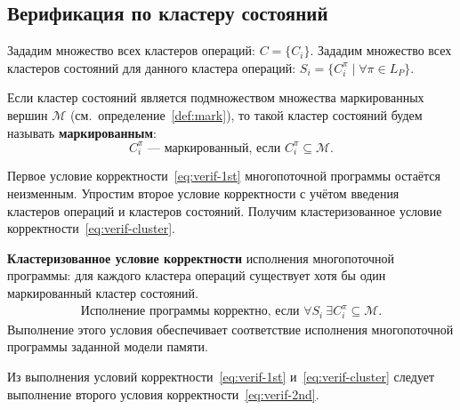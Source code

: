 \subsection{Верификация по кластеру состояний}
\label{sec:ch4/stategraph-cluster-verification}

Зададим множество всех кластеров операций: $C = \{C_i\}$. Зададим
множество всех кластеров состояний для данного кластера операций:
$S_i = \{C_i^{\pi} \mid \forall \pi \in L_P\}$.

\begin{definition}
  \label{eq:executed_st_cl}
  Если кластер состояний является подмножеством множества
  маркированных вершин $\mathcal{M}$
  (см.~определение~\ref{def:mark}), то такой кластер состояний будем
  называть \textbf{маркированным}:
  \begin{equation}
    C_i^\pi \text{ — маркированный, если } C_i^\pi \subseteq \mathcal{M}.
  \end{equation}
\end{definition}

Первое условие корректности~\ref{eq:verif-1st} многопоточной
программы остаётся неизменным. Упростим второе условие корректности с
учётом введения кластеров операций и кластеров состояний. Получим
кластеризованное условие корректности~\ref{eq:verif-cluster}.

\textbf{Кластеризованное условие корректности} исполнения
многопоточной программы: для каждого кластера операций существует
хотя бы один маркированный кластер состояний.
\begin{align}
  \label{eq:verif-cluster}
  \text{Исполнение программы корректно, если } \forall S_i\ \exists
  C_i^\pi \subseteq \mathcal{M}.
\end{align}
Выполнение этого условия обеспечивает соответствие исполнения
многопоточной программы заданной модели памяти.

\begin{lemma}
  Из выполнения условий корректности~\ref{eq:verif-1st}
  и~\ref{eq:verif-cluster} следует выполнение второго условия
  корректности~\ref{eq:verif-2nd}.
  \label{lm:verif-cluster}
\end{lemma}

